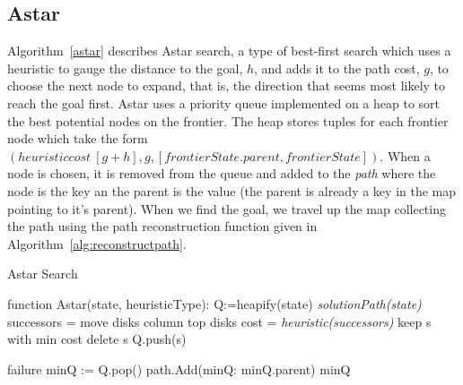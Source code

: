 \subsection{Astar}
Algorithm~\ref{astar} describes Astar search, a type of best-first search which uses a heuristic to gauge the distance to the goal, $h$, and adds it to the path cost, $g$, to choose the next node to expand, that is, the direction that seems most likely to reach the goal first.
Astar uses a priority queue implemented on a heap to sort the best potential nodes on the frontier.
The heap stores tuples for each frontier node which take the form $(heuristic cost ~ [g + h], g, [frontierState.parent, frontierState])$.
When a node is chosen, it is removed from the queue and added to the \textit{path} where the node is the key an the parent is the value (the parent is already a key in the map pointing to it's parent).
When we find the goal, we travel up the map collecting the path using the path reconstruction function given in Algorithm~\ref{alg:reconstructpath}.

\begin{algorithm}[!h]
\caption{Astar Search}
\label{astar}
\begin{algorithmic}
\STATE function Astar(state, heuristicType):
\STATE Q:=heapify(state)
	\RETURN \textit{solutionPath(state)}
\ENDIF
{}
    \STATE successors = move disks column top disks
    \STATE cost = \textit{heuristic(successors)}
\ENDIF 
{}
        \STATE keep s with min cost
        \STATE delete s
    \ELSE
        \STATE Q.push(s)
    \ENDIF
\ENDFOR

	\RETURN failure
\ELSE
	\STATE minQ := Q.pop()
    \STATE path.Add(minQ: minQ.parent)
    \RETURN minQ
\ENDIF
\end{algorithmic}
\end{algorithm}
